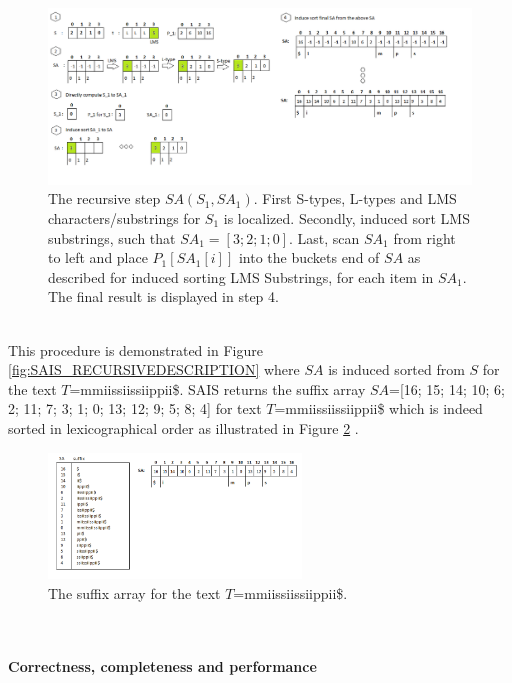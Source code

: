 \documentclass[12pt]{article} %
\begin{document}
\begin{figure}[H]
    \centering
    \includegraphics[width=1.0\textwidth]{SAIS_RECURSIVE}
    \captionsetup{width=0.8\textwidth}
    \caption{The recursive step $SA(S_1, SA_1)$.  First S-types, L-types and LMS characters/substrings for $S_1$ is localized. Secondly, induced sort LMS substrings, such that $SA_1 = [3;2;1;0]$. Last, scan $SA_1$ from right to left and place $P_1[SA_1[i]]$ into the buckets end of $SA$ as described for induced sorting LMS Substrings, for each item in $SA_1$. The final result is displayed in step 4.}
    \label{fig:SAIS_RECURSIVE}
    
\end{figure}
\\
This procedure is demonstrated in Figure \ref{fig:SAIS_RECURSIVEDESCRIPTION} where $SA$ is induced sorted from $S$ for the text $T$=mmiissiissiippii\$. SAIS returns the suffix array $SA$=[16; 15; 14; 10; 6; 2; 11; 7; 3; 1; 0; 13; 12; 9; 5; 8; 4] for text $T$=mmiissiissiippii\$ which is indeed sorted in lexicographical order as illustrated in Figure \ref{fig:SAIS_Sortedorder} \cite{twoeffecient}.
\\
\begin{figure}[H]
    \centering
    \includegraphics[width=0.6\textwidth]{SAIS_Sortedorder}
    \captionsetup{width=0.8\textwidth}
    \caption{The suffix array for the text $T$=mmiissiissiippii\$.}
    \label{fig:SAIS_Sortedorder}  
\end{figure}
\\ \\
\textbf{Correctness, completeness and performance}
\end{document}
